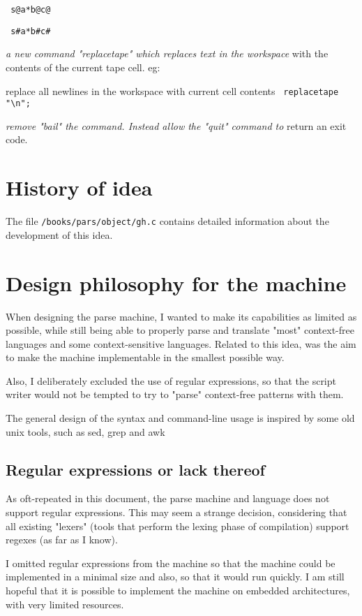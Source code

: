 \documentclass[a4paper,12pt]{article}
\begin{document}
 \verb| s@a*b@c@ |
 
 \verb| s#a*b#c# |

 \emph{ a new command "replacetape" which replaces text in the workspace }
    with the contents of the current tape cell. eg:

      replace all newlines in the workspace with current cell contents 
 \verb| replacetape "\n";  |

 \emph{ remove "bail" the command. Instead allow the "quit" command to  }
    return an exit code.

\section{History of idea}

  The file \texttt{/books/pars/object/gh.c} contains detailed information about the
  development of this idea.

\section{Design philosophy for the machine}

  When designing the parse machine, I wanted to make its capabilities as
  limited as possible, while still being able to properly parse and translate
  "most" context-free languages and some context-sensitive languages. Related
  to this idea, was the aim to make the machine implementable in the smallest
  possible way.

  Also, I deliberately excluded the use of regular expressions, so
  that the script writer would not be tempted to try to "parse"
  context-free patterns with them.

  The general design of the syntax and command-line usage is inspired
  by some old unix tools, such as sed, grep and awk

\subsection{Regular expressions or lack thereof}

  As oft-repeated in this document, the parse machine and language
  does not support regular expressions. This may seem a strange
  decision, considering that all existing "lexers" (tools that
  perform the lexing phase of compilation) support regexes (as
  far as I know).

  I omitted regular expressions from the machine so that the machine
  could be implemented in a minimal size and also, so that it
  would run quickly. I am still hopeful that it is possible to
  implement the machine on embedded architectures, with very
  limited resources.
\end{document}
